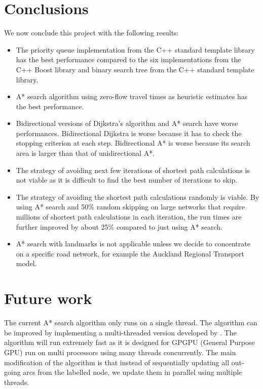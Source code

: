 \section{Conclusions}
We now conclude this project with the following results:
\begin{itemize}
    \item The priority queue implementation from the C++ standard template library has the best performance compared to the six implementations from the C++ Boost library and binary search tree from the C++ standard template library.
    \item A* search algorithm using zero-flow travel times as heuristic estimates has the best performance.
    \item Bidirectional versions of Dijkstra's algorithm and A* search have worse performances. Bidirectional Dijkstra is worse because it has to check the stopping criterion at each step. Bidirectional A* is worse because its search area is larger than that of unidirectional A*.
    \item The strategy of avoiding next few iterations of shortest path calculations is not viable as it is difficult to find the best number of iterations to skip.  
    \item The strategy of avoiding the shortest path calculations randomly is viable. By using A* search and 50\% random skipping on large networks that require millions of shortest path calculations in each iteration, the run times are further improved by about 25\% compared to just using A* search.
    \item A* search with landmarks is not applicable unless we decide to concentrate on a specific road network, for example the Auckland Regional Transport model. 
\end{itemize}


\section{Future work}
The current A* search algorithm only runs on a single thread.
The algorithm can be improved by implementing a multi-threaded version developed
by \citet{Inam}.
The algorithm will run extremely fast as it is designed for GPGPU (General Purpose GPU) run on multi processors using many threads concurrently.
The main modification of the algorithm is that  
instead of sequentially updating all out-going arcs from the labelled node,
we update them in parallel using multiple threads.


